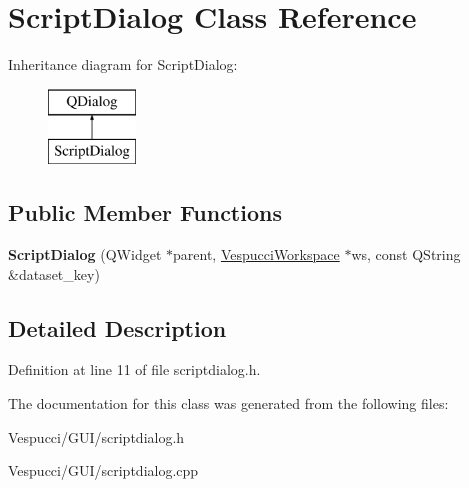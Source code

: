 \hypertarget{class_script_dialog}{}\section{Script\+Dialog Class Reference}
\label{class_script_dialog}
Inheritance diagram for Script\+Dialog\+:\begin{figure}[H]
\begin{center}
\leavevmode
\includegraphics[height=2.000000cm]{class_script_dialog}
\end{center}
\end{figure}
\subsection*{Public Member Functions}
\begin{DoxyCompactItemize}
\item 
{\bfseries Script\+Dialog} (Q\+Widget $\ast$parent, \hyperlink{class_vespucci_workspace}{Vespucci\+Workspace} $\ast$ws, const Q\+String \&dataset\+\_\+key)\hypertarget{class_script_dialog_a3440f831f83ec6a4f24e17a10d505476}{}\label{class_script_dialog_a3440f831f83ec6a4f24e17a10d505476}

\end{DoxyCompactItemize}


\subsection{Detailed Description}


Definition at line 11 of file scriptdialog.\+h.



The documentation for this class was generated from the following files\+:\begin{DoxyCompactItemize}
\item 
Vespucci/\+G\+U\+I/scriptdialog.\+h\item 
Vespucci/\+G\+U\+I/scriptdialog.\+cpp\end{DoxyCompactItemize}
